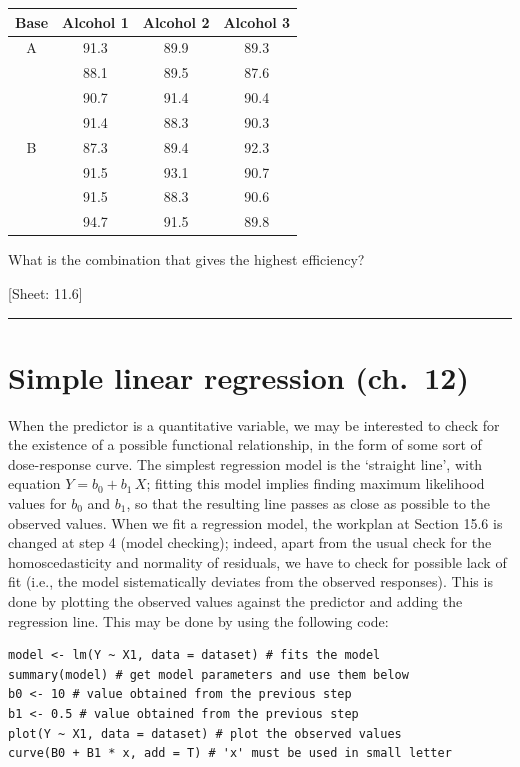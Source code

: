 \documentclass[a4paper,12pt,oneside]{book}
\begin{document}
\begin{longtable}[]{@{}cccc@{}}
\toprule\noalign{}
Base & Alcohol 1 & Alcohol 2 & Alcohol 3 \\
\midrule\noalign{}
\endhead
\bottomrule\noalign{}
\endlastfoot
A & 91.3 & 89.9 & 89.3 \\
& 88.1 & 89.5 & 87.6 \\
& 90.7 & 91.4 & 90.4 \\
& 91.4 & 88.3 & 90.3 \\
B & 87.3 & 89.4 & 92.3 \\
& 91.5 & 93.1 & 90.7 \\
& 91.5 & 88.3 & 90.6 \\
& 94.7 & 91.5 & 89.8 \\
\end{longtable}

What is the combination that gives the highest efficiency?

{[}Sheet: 11.6{]}

\begin{center}\rule{0.5\linewidth}{0.5pt}\end{center}

\hypertarget{simple-linear-regression-ch.-12}{%
\section{Simple linear regression (ch.~12)}\label{simple-linear-regression-ch.-12}}

When the predictor is a quantitative variable, we may be interested to check for the existence of a possible functional relationship, in the form of some sort of dose-response curve. The simplest regression model is the `straight line', with equation \(Y = b_0 + b_1 \, X\); fitting this model implies finding maximum likelihood values for \(b_0\) and \(b_1\), so that the resulting line passes as close as possible to the observed values. When we fit a regression model, the workplan at Section 15.6 is changed at step 4 (model checking); indeed, apart from the usual check for the homoscedasticity and normality of residuals, we have to check for possible lack of fit (i.e., the model sistematically deviates from the observed responses). This is done by plotting the observed values against the predictor and adding the regression line. This may be done by using the following code:

\begin{verbatim}
model <- lm(Y ~ X1, data = dataset) # fits the model
summary(model) # get model parameters and use them below
b0 <- 10 # value obtained from the previous step
b1 <- 0.5 # value obtained from the previous step
plot(Y ~ X1, data = dataset) # plot the observed values
curve(B0 + B1 * x, add = T) # 'x' must be used in small letter
\end{verbatim}
\end{document}
